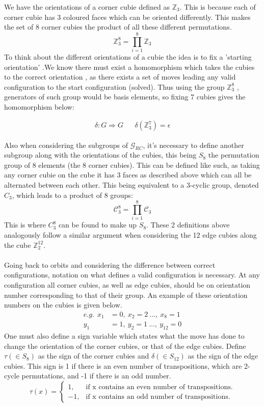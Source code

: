\documentclass{article}
\newcounter{lem}[section]\setcounter{lem}{0}
\begin{document}
We have the orientations of a corner cubie defined as $\mathbb{Z}_3$.
This is because each of corner cubie has 3 coloured faces which can be oriented differently. 
This makes the set of 8 corner cubies the product of all these different permutations.\[\mathbb{Z}_{3}^8 = \prod_{i=1}^{8}\mathbb{Z}_{3}\]
To think about the different orientations of a cubie the idea is to fix a 'starting orientation' .We know there must exist a homomorphism which takes the cubies to the correct orientation , as there exists a set of moves leading any valid configuration to the start configuration (solved). Thus using the group $\mathbb{Z}_{3}^{8}$ , generators of such group would be basis elements,  so fixing 7 cubies gives the homomorphism below: 

\begin{align}
	\delta : G \Rightarrow G && \delta(\mathbb{Z}_{3}^{7}) = \epsilon
\end{align}

Also when considering the subgroups of $\mathcal{G}_{RC}$, it's necessary to define another subgroup along with the orientations of the cubies, this being $S_{8}$ the permutation group of 8 elements (the 8 corner cubies). This can be defined like such, as taking any corner cubie on the cube it has 3 faces as described above which can all be alternated between each other. This being equivalent to a 3-cyclic group, denoted $C_{3}$, which leads to a product of 8 groups: \[\mathcal{C}_{3}^8 = \prod_{i=1}^{8}\mathcal{C}_{3}\] This is where $C_{3}^{8}$ can be found to make up $S_{8}$. These 2 definitions above analogously follow a similar argument when considering the 12 edge cubies along the cube $\mathbb{Z}^{12}_{2}$.
\paragraph*{}
Going back to orbits and considering the difference between correct configurations, notation on what defines a valid configuration is necessary. At any configuration all corner cubies, as well as edge cubies, should be on orientation number corresponding to that of their group. An example of these orientation numbers on the cubies is given below.
\begin{align*}
e.g.\ \ x_1&=0,\ x_2=2\ ...,\ x_8=1\\
y_1&=1,\ y_2=1\ ... ,\ y_{12}=0
\end{align*}
One must also define a sign variable which states what the move has done to change the orientation of the corner cubies, or that of the edge cubies. 
Define $\tau (\in S_{8})$ as the sign of the corner cubies and $\delta (\in  S_{12})$ as the sign of the edge cubies. This sign is 1 if there is an even number of transpositions, which are 2-cycle permutations, and -1 if there is an odd number. 
\begin{equation}
  \tau(x)=\begin{cases}
    1, & \text{if x contains an even number of transpositions}.\\
    -1, & \text{if x contains an odd number of transpositions}.
  \end{cases}
\end{equation}
\end{document}
